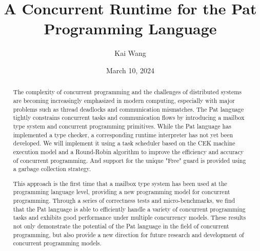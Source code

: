 \documentclass{l4proj}
\begin{document}
\title{A Concurrent Runtime for the Pat Programming Language}
\author{Kai Wang}
\date{March 10, 2024}

\maketitle

\begin{abstract}

The complexity of concurrent programming and the challenges of distributed systems are becoming increasingly emphasized in modern computing, especially with major problems such as thread deadlocks and communication mismatches. The Pat language tightly constrains concurrent tasks and communication flows by introducing a mailbox type system and concurrent programming primitives. While the Pat language has implemented a type checker, a corresponding runtime interpreter has not yet been developed. We will implement it using a task scheduler based on the CEK machine execution model and a Round-Robin algorithm to improve the efficiency and accuracy of concurrent programming. And support for the unique "Free" guard is provided using a garbage collection strategy.

This approach is the first time that a mailbox type system has been used at the programming language level, providing a new programming model for concurrent programming. Through a series of correctness tests and micro-benchmarks, we find that the Pat language is able to efficiently handle a variety of concurrent programming tasks and exhibits good performance under multiple concurrency models. These results not only demonstrate the potential of the Pat language in the field of concurrent programming, but also provide a new direction for future research and development of concurrent programming models.
\end{abstract}


\clearpage %
\null\vspace{\fill} 
\end{document}
